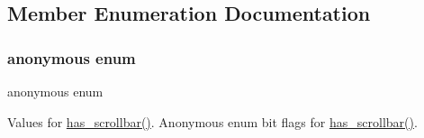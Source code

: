 \subsection{Member Enumeration Documentation}
\mbox{\label{class_fl___browser___ae31c28a4c79819d686805fdd1e48698e}} 
\subsubsection{\texorpdfstring{anonymous enum}{anonymous enum}}
{\footnotesize\ttfamily anonymous enum}

Values for \hyperlink{class_fl___browser___a67d0ca392fbc14371277661a4ab75fc7}{has\+\_\+scrollbar()}. Anonymous enum bit flags for \hyperlink{class_fl___browser___a67d0ca392fbc14371277661a4ab75fc7}{has\+\_\+scrollbar()}.
